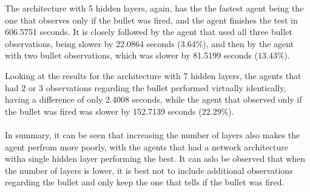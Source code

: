 The architecture with 5 hidden layers, again, has the the fastest agent being the one that observes only if the bullet was fired, and the agent finishes the test in 606.5751 seconds. It is closely followed by the agent that used all three bullet observations, being slower by 22.0864 seconds ($3.64\%$), and then by the agent with two bullet observations, which was slower by 81.5199 seconds ($13.43\%$).

Looking at the results for the architecture with 7 hidden layers, the agents that had 2 or 3 observations regarding the bullet performed virtually identically, having a difference of only 2.4008 seconds, while the agent that observed only if the bullet was fired was slower by 152.7139 seconds ($22.29\%$).

\paragraph{}
In summary, it can be seen that increasing the number of layers also makes the agent perfrom more poorly, with the agents that had a network architecture witha  single hidden layer performing the best. It can aslo be observed that when the number of layers is lower, it is best not to include additional observations regarding the bullet and only keep the one that tells if the bullet was fired.

